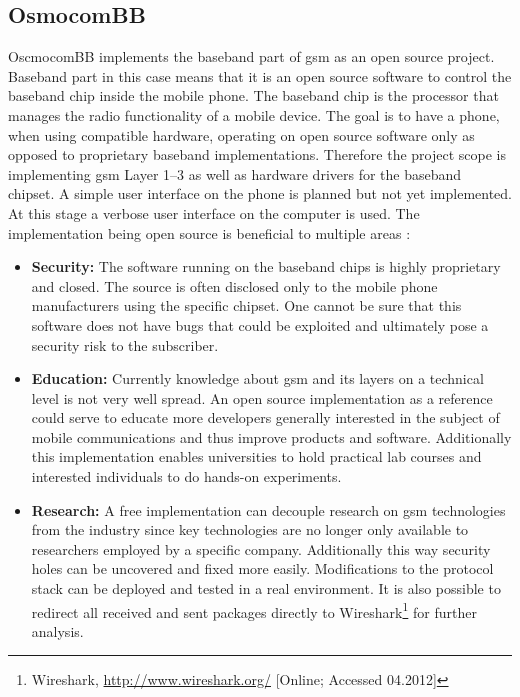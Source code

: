 \subsection{OsmocomBB}
OscmocomBB implements the baseband part of \gls{gsm} as an open source project.
Baseband part in this case means that it is an open source software to control the baseband chip inside the mobile phone.
The baseband chip is the processor that manages the radio functionality of a mobile device.
The goal is to have a phone, when using compatible hardware, operating on open source software only as opposed to proprietary baseband implementations.
Therefore the project scope is implementing \gls{gsm} Layer 1--3 as well as hardware drivers for the baseband chipset.
A simple user interface on the phone is planned but not yet implemented.
At this stage a verbose user interface on the computer is used.
The implementation being open source is beneficial to multiple areas \cite{osmo_rationale}:
\begin{itemize}
	\item \textbf{Security:} The software running on the baseband chips is highly proprietary and closed.
	The source is often disclosed only to the mobile phone manufacturers using the specific chipset.
	One cannot be sure that this software does not have bugs that could be exploited and ultimately pose a security risk to the subscriber.
	\item \textbf{Education:} Currently knowledge about \gls{gsm} and its layers on a technical level is not very well spread.
	An open source implementation as a reference could serve to educate more developers generally interested in the subject of mobile communications and thus improve products and software.
	Additionally this implementation enables universities to hold practical lab courses and interested individuals to do hands-on experiments.
	\item \textbf{Research:} A free implementation can decouple research on \gls{gsm} technologies from the industry since key technologies are no longer only available to researchers employed by a specific company.
	Additionally this way security holes can be uncovered and fixed more easily.
	Modifications to the protocol stack can be deployed and tested in a real environment.
	It is also possible to redirect all received and sent packages directly to Wireshark\footnote{Wireshark, \url{http://www.wireshark.org/} [Online; Accessed 04.2012]} for further analysis.
\end{itemize}

